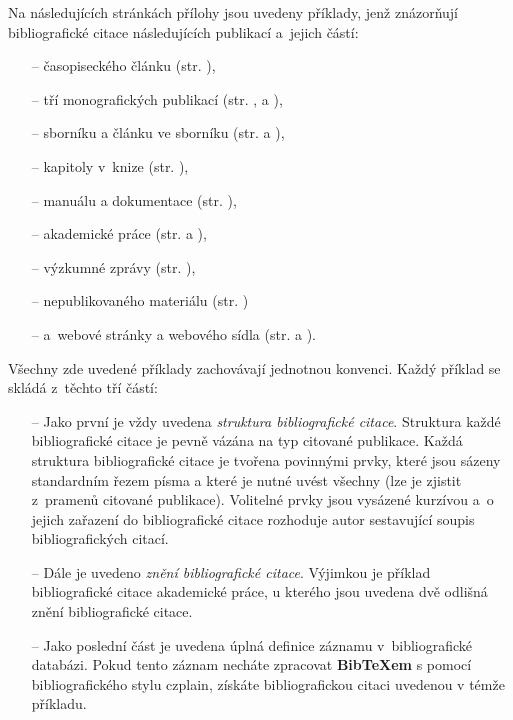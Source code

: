 Na následujících stránkách přílohy jsou uvedeny příklady, jenž znázorňují bibliografické citace následujících publikací a~jejich částí:
\begin{itemize}
   \item[--] časopiseckého článku (str. \pageref{pr-casopis-clanek}),
   \item[--] tří monografických publikací (str. \pageref{pr-monografie1},
               \pageref{pr-monografie2} a \pageref{pr-monografie3}),
   \item[--] sborníku a článku ve sborníku (str. \pageref{pr-sbornik} a \pageref{pr-sbornik-clanek}),
   \item[--] kapitoly v~knize (str. \pageref{pr-kapitola-monografie}),
   \item[--] manuálu a dokumentace (str. \pageref{pr-manual-doc}),
   \item[--] akademické práce (str. \pageref{pr-akademicka-prace1} a \pageref{pr-akademicka-prace2}),
   \item[--] výzkumné zprávy (str. \pageref{pr-vyzkum}),
   \item[--] nepublikovaného materiálu (str. \pageref{pr-nepublikovane})
   \item[--] a~webové stránky a webového sídla (str. \pageref{pr-webpage} a \pageref{pr-website}).
\end{itemize}

Všechny zde uvedené příklady zachovávají jednotnou konvenci. Každý příklad se skládá z~těchto tří částí:
\begin{itemize}
\item[--] Jako první je vždy uvedena {\em struktura bibliografické citace}. Struktura každé bibliografické citace je pevně vázána na typ citované publikace. Každá struktura bibliografické citace je tvořena povinnými prvky, které jsou sázeny standardním řezem písma a které je nutné uvést všechny (lze je zjistit z~pramenů citované publikace). Volitelné prvky jsou vysázené kurzívou a~o jejich zařazení do bibliografické citace rozhoduje autor sestavující soupis bibliografických citací. 

\item[--] Dále je uvedeno {\em znění bibliografické citace}. Výjimkou je příklad bibliografické citace akademické práce, u kterého jsou uvedena dvě odlišná znění bibliografické citace.

\item[--] Jako poslední část je uvedena úplná definice záznamu v~bibliografické databázi. Pokud tento záznam necháte zpracovat \textbf{BibTeXem} s pomocí bibliografického stylu czplain, získáte bibliografickou citaci uvedenou
v témže příkladu.
\end{itemize}

